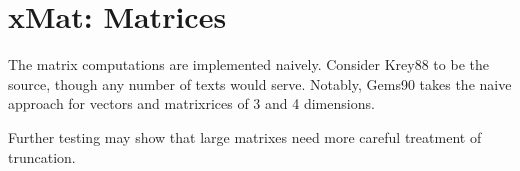 \section{xMat: Matrices}
The matrix computations are implemented naively.  Consider
Krey88 to be the source, though any number of texts would
serve.  Notably, Gems90 takes the naive approach for vectors
and matrixrices of 3 and 4 dimensions.

Further testing may show that large matrixes need more
careful treatment of truncation.
